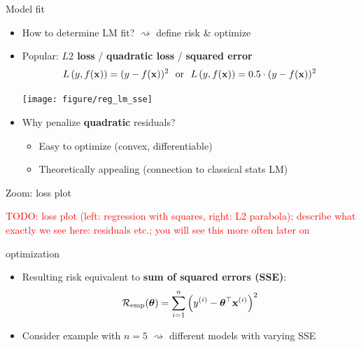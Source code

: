 \documentclass[11pt,compress,t,notes=noshow, xcolor=table]{beamer}
\begin{document}

\begin{frame}{Model fit}

\begin{itemize}
    \item How to determine LM fit? $\rightsquigarrow$ define risk \& optimize
    \item Popular: \textbf{$L2$ loss} / \textbf{quadratic loss} / 
    \textbf{squared error}
    $$L\left(y, f(\mathbf{x})\right) = (y-f(\mathbf{x}))^2 ~~ \text{or} ~~ L\left(y, f(\mathbf{x})\right) = 0.5 \cdot (y-f(\mathbf{x}))^2$$
    
    \texttt{[image: figure/reg\_lm\_sse]}
    \item Why penalize \textbf{quadratic} residuals?
    \begin{itemize}
        \item Easy to optimize (convex, differentiable)
        \item Theoretically appealing (connection to classical stats LM)
    \end{itemize}
\end{itemize}

\end{frame}


\begin{frame}{Zoom: loss plot}

\textcolor{red}{TODO: loss plot (left: regression with squares, right: 
L2 parabola); describe what exactly we see here: residuals etc.; you will see 
this more often later on}

\end{frame}


\begin{frame}{optimization}

\begin{itemize}
    \item Resulting risk equivalent to 
    \textbf{sum of squared errors (SSE)}:
    $$\mathcal{R}_{\text{emp}}(\bm{\theta}) = \sum\limits_{i=1}^n \left(y^{(i)} - \bm{\theta}^\top \mathbf{x}^{(i)} \right)^2$$
    \item Consider example with $n = 5$ $\rightsquigarrow$ 
    different models with varying SSE
\end{itemize}

\vfill
{}

\end{frame}
\end{document}
